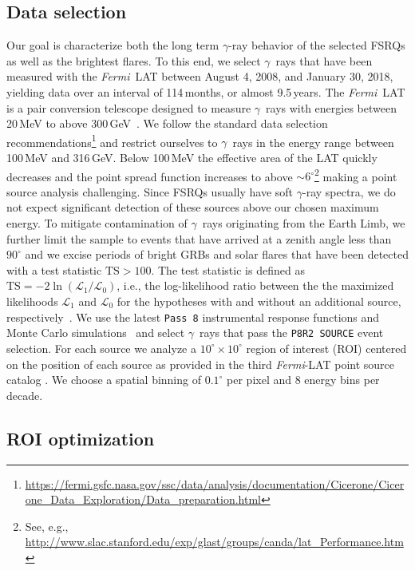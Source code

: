 \documentclass[twocolumn,linenumbers]{aastex62}
\newcommand{\Grays}{$\gamma$~rays\xspace}
\newcommand{\gray}{$\gamma$-ray\xspace}
\newcommand{\FermiLAT}{\emph{Fermi}~LAT\xspace}
\newcommand{\fermiLAT}{\emph{Fermi}-LAT\xspace}
\begin{document}
\subsection{Data selection}

Our goal is characterize both the long term \gray behavior of the selected FSRQs as well as the brightest flares.
To this end, we select \Grays that have been measured with the \FermiLAT between August 4, 2008, and January 30, 2018, yielding data over an interval of 114\,months, or almost 9.5\,years.
The \FermiLAT is a pair conversion telescope designed to measure \Grays with energies between 20\,MeV to above 300\,GeV~\citep{2009ApJ...697.1071A}.
We follow the standard data selection recommendations\footnote{\url{https://fermi.gsfc.nasa.gov/ssc/data/analysis/documentation/Cicerone/Cicerone_Data_Exploration/Data_preparation.html}} and  restrict ourselves to \Grays in the energy range between 100\,MeV and 316\,GeV. 
Below 100\,MeV the effective area of the LAT quickly decreases and the point spread function increases to above $\sim 6^\circ$\footnote{See, e.g., \url{http://www.slac.stanford.edu/exp/glast/groups/canda/lat_Performance.htm}} making a point source analysis challenging. 
Since FSRQs usually have soft \gray spectra, we do not expect significant detection of these sources above our chosen maximum energy.
To mitigate contamination of \Grays originating from the Earth Limb, we further limit the sample to events that have arrived at a zenith angle less than $90^\circ$ and we excise periods of bright GRBs and solar flares that have been detected with a test statistic $\mathrm{TS} > 100$.
The test statistic is defined as $\mathrm{TS} = -2\ln(\mathcal{L}_1 / \mathcal{L}_0)$, i.e., the log-likelihood ratio between the the maximized likelihoods $\mathcal{L}_1$ and $\mathcal{L}_0$ for the hypotheses with and without an additional source, respectively~\citep{mattox1996}.
We use the latest \texttt{Pass 8} instrumental response functions and Monte Carlo simulations~\citep{pass8} and select \Grays that pass the \texttt{P8R2 SOURCE} event selection. 
For each source we analyze a $10^\circ \times 10^\circ$ region of interest (ROI) centered on the position of each source as provided in the third \fermiLAT point source catalog \citep[3FGL,][]{3fgl}.
We choose a spatial binning of $0.1^\circ$ per pixel and 8 energy bins per decade. 

\subsection{ROI optimization}
\label{sec:roi}
\end{document}
